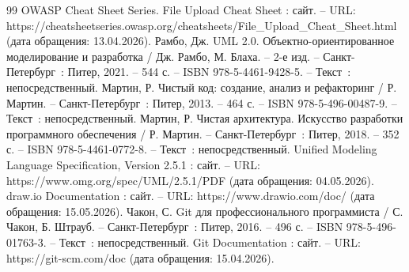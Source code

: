 \begin{thebibliography}{99}
	 OWASP Cheat Sheet Series. File Upload Cheat Sheet : сайт. -- URL: https://cheatsheetseries.owasp.org/cheatsheets/File\_Upload\_Cheat\_Sheet.html (дата обращения: 13.04.2026).
	 Рамбо, Дж. UML 2.0. Объектно-ориентированное моделирование и разработка / Дж. Рамбо, М. Блаха. -- 2-е изд. -- Санкт-Петербург~: Питер, 2021. -- 544 с. -- ISBN 978-5-4461-9428-5. -- Текст~: непосредственный.
	 Мартин, Р. Чистый код: создание, анализ и рефакторинг / Р. Мартин. -- Санкт-Петербург~: Питер, 2013. -- 464 с. -- ISBN 978-5-496-00487-9. -- Текст~: непосредственный.
	 Мартин, Р. Чистая архитектура. Искусство разработки программного обеспечения / Р. Мартин. -- Санкт-Петербург~: Питер, 2018. -- 352 с. -- ISBN 978-5-4461-0772-8. -- Текст~: непосредственный.
	 Unified Modeling Language Specification, Version 2.5.1 : сайт. -- URL: https://www.omg.org/spec/UML/2.5.1/PDF (дата обращения: 04.05.2026).
	 draw.io Documentation : сайт. -- URL: https://www.drawio.com/doc/ (дата обращения: 15.05.2026).
	 Чакон, С. Git для профессионального программиста / С. Чакон, Б. Штрауб. -- Санкт-Петербург~: Питер, 2016. -- 496 с. -- ISBN 978-5-496-01763-3. -- Текст~: непосредственный.
	 Git Documentation : сайт. -- URL: https://git-scm.com/doc (дата обращения: 15.04.2026).
\end{thebibliography}